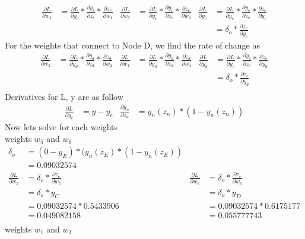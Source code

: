 \documentclass[12pt,english]{article}
\begin{document}
\begin{align*}
\frac{\partial L}{\partial w_1} &=\frac{\partial L}{\partial y_c} * \frac{\partial y_c}{\partial z_c} * \frac{\partial z_c}{\partial w_1} &
\frac{\partial L}{\partial w_3} &=\frac{\partial L}{\partial y_c} * \frac{\partial y_c}{\partial z_c} * \frac{\partial z_c}{\partial w_3} &
 \frac{\partial L}{\partial y_c}  &= \frac{\partial L}{\partial y_e} * \frac{\partial y_e}{\partial z_e} * \frac{\partial z_e}{\partial y_c}\\
& &&&   &= \delta_o * \frac{\partial z_e}{\partial y_c} 
\end{align*}
 For the weights that connect to Node D, we find the rate of change as
\begin{align*}
\frac{\partial L}{\partial w_2} &=\frac{\partial L}{\partial y_d} * \frac{\partial y_d}{\partial z_d} * \frac{\partial z_d}{\partial w_2} &
\frac{\partial L}{\partial w_4} &=\frac{\partial L}{\partial y_d} * \frac{\partial y_d}{\partial z_d} * \frac{\partial z_d}{\partial w_4} &
 \frac{\partial L}{\partial y_d}  &= \frac{\partial L}{\partial y_e} * \frac{\partial y_e}{\partial z_e} * \frac{\partial z_e}{\partial y_d} \\
& &&&  &= \delta_o * \frac{\partial z_e}{\partial y_d} \\
\end{align*}
Derivatives for L, y  are as follow
\begin{align*}
\frac{\partial L}{\partial y_e} &= y -y_e &
 \frac{\partial y_n}{\partial z_n}&= y_n(z_n) * (1 - y_n(z_n))
\end{align*}
Now lets solve for each weights\\
weights $w_5$ and $w_6$
\begin{align*}
\delta_o &=(0 - y_E) * (y_n(z_E) *(1 -y_n(z_E))\\
 &=0.09032574\\
\frac{\partial L}{\partial w_5} &=\delta_o* \frac{\partial z_e}{\partial w_5} &
\frac{\partial L}{\partial w_6} &=\delta_o * \frac{\partial z_e}{\partial w_6} \\
&=\delta_o * y_C &
&=\delta_o * y_D \\
&=0.09032574 * 0.5433906 &
&=0.09032574 * 0.6175177 \\
&=0.049082158&
&=0.055777743\\
\end{align*}
weights $w_1$ and $w_3$
\end{document}
